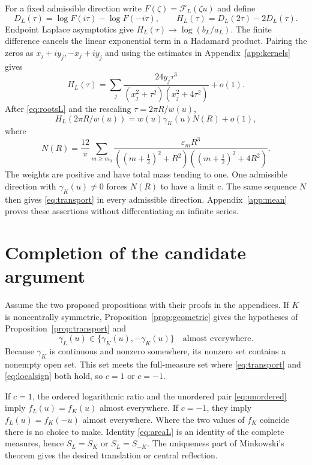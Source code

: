 \documentclass[11pt,a4paper]{article}
\theoremstyle{definition}
\theoremstyle{remark}
\newcommand{\F}{\mathcal F}
\numberwithin{equation}{section}
\begin{document}
For a fixed admissible direction write $F(\zeta)=\F_L(\zeta u)$ and define
\begin{equation}\label{eq:DH}
 D_L(\tau)=\log F(i\tau)-\log F(-i\tau),\qquad
 H_L(\tau)=D_L(2\tau)-2D_L(\tau).
\end{equation}
Endpoint Laplace asymptotics give
$H_L(\tau)\to\log(b_L/a_L)$. The finite difference cancels the linear
exponential term in a Hadamard product. Pairing the zeros as
$x_j+iy_j,-x_j+iy_j$ and using the estimates in Appendix~\ref{app:kernels}
gives
\begin{equation}\label{eq:Hkernel}
 H_L(\tau)=
 \sum_j\frac{24y_j\tau^3}
 {(x_j^2+\tau^2)(x_j^2+4\tau^2)}+o(1).
\end{equation}
After \eqref{eq:rootsL} and the rescaling $\tau=2\pi R/w(u)$,
\begin{equation}\label{eq:Hmean}
 H_L(2\pi R/w(u))=w(u)\gamma_K(u)N(R)+o(1),
\end{equation}
where
\begin{equation}\label{eq:mean}
 N(R)=\frac{12}{\pi}\sum_{m\ge m_0}
 \frac{\varepsilon_m R^3}
 {((m+\tfrac12)^2+R^2)((m+\tfrac12)^2+4R^2)} .
\end{equation}
The weights are positive and have total mass tending to one.
One admissible direction with $\gamma_K(u)\ne0$ forces $N(R)$ to have
a limit $c$. The same sequence $N$ then gives \eqref{eq:transport} in
every admissible direction. Appendix~\ref{app:mean} proves these assertions
without differentiating an infinite series.

\section{Completion of the candidate argument}\label{sec:completion}
Assume the two proposed propositions with their proofs in the appendices.
If $K$ is noncentrally symmetric, Proposition~\ref{prop:geometric} gives
the hypotheses of Proposition~\ref{prop:transport} and
\begin{equation}\label{eq:localsign}
 \gamma_L(u)\in\{\gamma_K(u),-\gamma_K(u)\}
 \quad\text{almost everywhere}.
\end{equation}
Because $\gamma_K$ is continuous and nonzero somewhere, its nonzero set
contains a nonempty open set. This set meets the full-measure set where
\eqref{eq:transport} and \eqref{eq:localsign} both hold, so $c=1$ or $c=-1$.

If $c=1$, the ordered logarithmic ratio and the unordered pair
\eqref{eq:unordered} imply $f_L(u)=f_K(u)$ almost everywhere.
If $c=-1$, they imply $f_L(u)=f_K(-u)$ almost everywhere.
Where the two values of $f_K$ coincide there is no choice to make.
Identity \eqref{eq:areaL} is an identity of the complete measures, hence
$S_L=S_K$ or $S_L=S_{-K}$. The uniqueness part of Minkowski's theorem
\cite{Schneider} gives the desired translation or central reflection.
\end{document}
